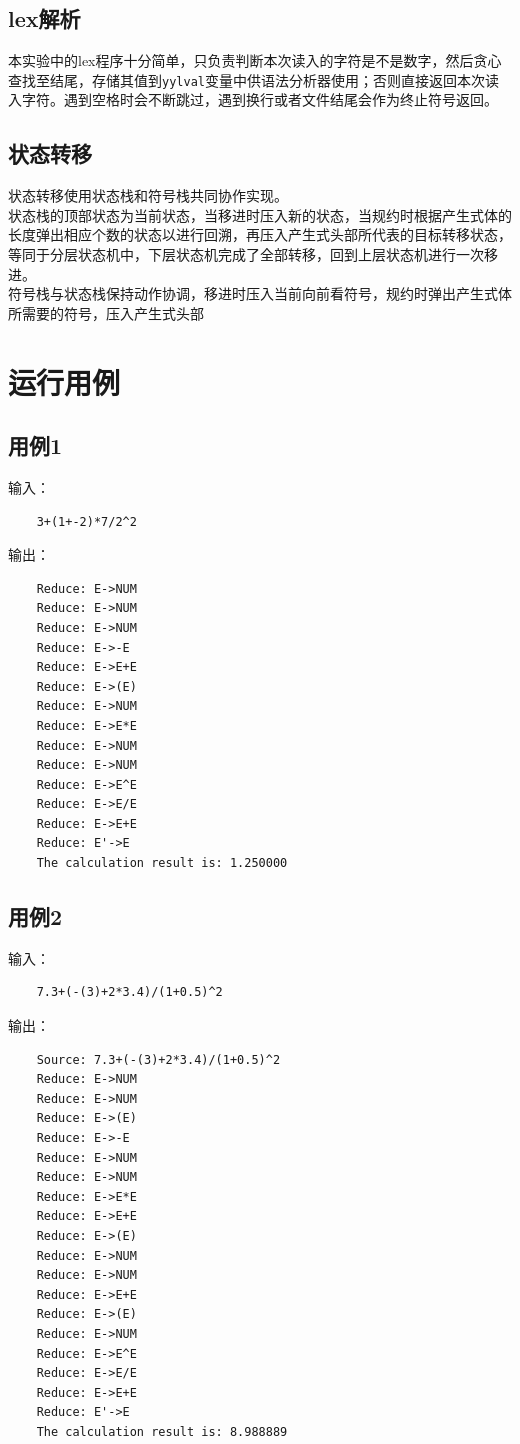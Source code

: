 \documentclass[a4paper]{ctexart} %
\begin{document}
	\subsection{lex解析}
	本实验中的lex程序十分简单，只负责判断本次读入的字符是不是数字，然后贪心查找至结尾，存储其值到\verb|yylval|变量中供语法分析器使用；否则直接返回本次读入字符。遇到空格时会不断跳过，遇到换行或者文件结尾会作为终止符号返回。
	\subsection{状态转移}
	状态转移使用状态栈和符号栈共同协作实现。\\
	状态栈的顶部状态为当前状态，当移进时压入新的状态，当规约时根据产生式体的长度弹出相应个数的状态以进行回溯，再压入产生式头部所代表的目标转移状态，等同于分层状态机中，下层状态机完成了全部转移，回到上层状态机进行一次移进。\\
	符号栈与状态栈保持动作协调，移进时压入当前向前看符号，规约时弹出产生式体所需要的符号，压入产生式头部

	\section{运行用例}

	\subsection{用例1}

	输入：
	\begin{verbatim}
	3+(1+-2)*7/2^2
	\end{verbatim}

	输出：
	\begin{verbatim}
	Reduce: E->NUM
	Reduce: E->NUM
	Reduce: E->NUM
	Reduce: E->-E
	Reduce: E->E+E
	Reduce: E->(E)
	Reduce: E->NUM
	Reduce: E->E*E
	Reduce: E->NUM
	Reduce: E->NUM
	Reduce: E->E^E
	Reduce: E->E/E
	Reduce: E->E+E
	Reduce: E'->E
	The calculation result is: 1.250000
	\end{verbatim}

	\subsection{用例2}

	输入：
	\begin{verbatim}
	7.3+(-(3)+2*3.4)/(1+0.5)^2
	\end{verbatim}

	输出：
	\begin{verbatim}
	Source: 7.3+(-(3)+2*3.4)/(1+0.5)^2
	Reduce: E->NUM
	Reduce: E->NUM
	Reduce: E->(E)
	Reduce: E->-E
	Reduce: E->NUM
	Reduce: E->NUM
	Reduce: E->E*E
	Reduce: E->E+E
	Reduce: E->(E)
	Reduce: E->NUM
	Reduce: E->NUM
	Reduce: E->E+E
	Reduce: E->(E)
	Reduce: E->NUM
	Reduce: E->E^E
	Reduce: E->E/E
	Reduce: E->E+E
	Reduce: E'->E
	The calculation result is: 8.988889	
	\end{verbatim}
\end{document}
